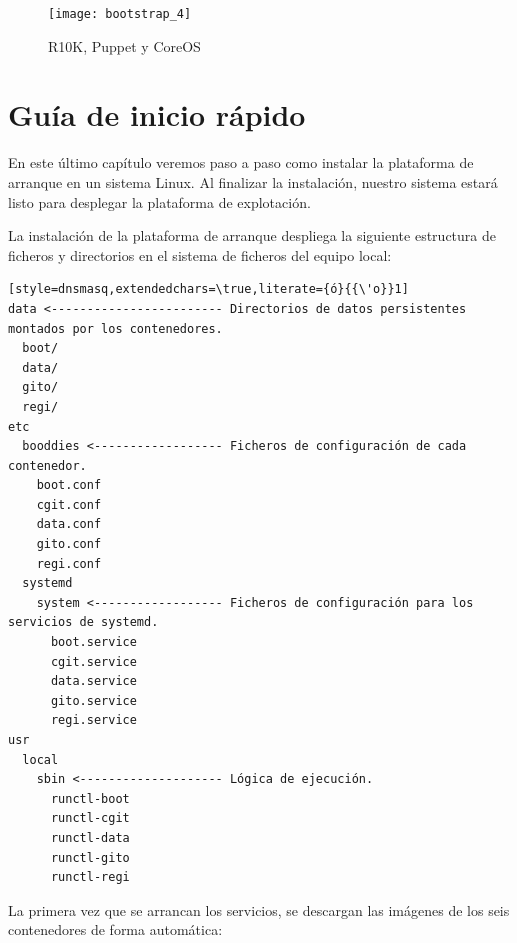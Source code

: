 \documentclass[a4paper,12pt,spanish,final]{epsc_tfc_pfc}
\begin{document}
\begin{figure}[h]
  \centering
    \texttt{[image: bootstrap\_4]}
      \caption{R10K, Puppet y CoreOS}
\end{figure}


\chapter{Guía de inicio rápido}

En este último capítulo veremos paso a paso como instalar la plataforma de arranque en un sistema Linux. Al finalizar la instalación, nuestro sistema estará listo para desplegar la plataforma de explotación.

La instalación de la plataforma de arranque despliega la siguiente estructura de ficheros y directorios en el sistema de ficheros del equipo local:\\

\begin{lstlisting}[style=dnsmasq,extendedchars=\true,literate={ó}{{\'o}}1]
data <------------------------ Directorios de datos persistentes montados por los contenedores.
  boot/
  data/
  gito/
  regi/
etc
  booddies <------------------ Ficheros de configuración de cada contenedor.
    boot.conf
    cgit.conf
    data.conf
    gito.conf
    regi.conf
  systemd
    system <------------------ Ficheros de configuración para los servicios de systemd.
      boot.service
      cgit.service
      data.service
      gito.service
      regi.service
usr
  local
    sbin <-------------------- Lógica de ejecución.
      runctl-boot
      runctl-cgit
      runctl-data
      runctl-gito
      runctl-regi
\end{lstlisting}

La primera vez que se arrancan los servicios, se descargan las imágenes de los seis contenedores de forma automática:\\
\end{document}
